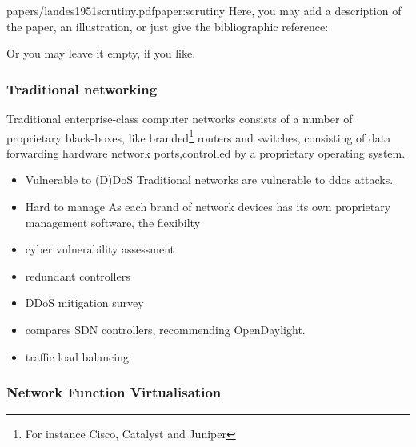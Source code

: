 
\begin{paper}{papers/landes1951scrutiny.pdf}{paper:scrutiny}
    Here, you may add a description of the paper, an illustration, or just give the bibliographic reference:
    \begin{quote}
    \end{quote}
    Or you may leave it empty, if you like.
\end{paper}





\subsubsection{Traditional networking}
Traditional enterprise-class computer networks consists of a number of proprietary black-boxes, like branded\footnote{For instance Cisco, Catalyst and Juniper} routers and switches, consisting of data forwarding hardware network ports,controlled by a proprietary operating system. 

\begin{itemize}
\item{Vulnerable to (D)DoS} Traditional networks are vulnerable to \acrfull{ddos} attacks. \\

\item{Hard to manage} As each brand of network devices has its own proprietary management software, the flexibilty 
\end{itemize}

\begin{itemize}
\item cyber vulnerability assessment
\item redundant controllers

\item DDoS mitigation survey \cite{hameed2018sdn}
\item compares SDN controllers, recommending OpenDaylight\cite{arbettu2016security}.   


\item traffic load balancing\cite{ejaz2019traffic} \\ 

\end{itemize}



\subsubsection{Network Function Virtualisation}

